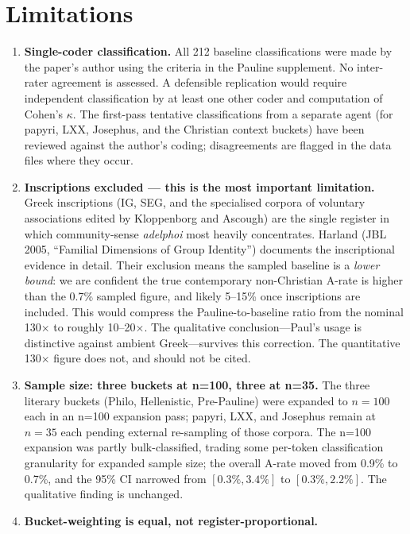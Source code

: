 \documentclass[11pt,oneside]{article}
\begin{document}
\section*{Limitations}

\begin{enumerate}[leftmargin=1.5em]
\item \textbf{Single-coder classification.}  All 212 baseline
  classifications were made by the paper's author using the criteria in
  the Pauline supplement.  No inter-rater agreement is assessed.
  A defensible replication would require independent classification by
  at least one other coder and computation of Cohen's $\kappa$.  The
  first-pass tentative classifications from a separate agent (for
  papyri, LXX, Josephus, and the Christian context buckets) have been
  reviewed against the author's coding; disagreements are flagged in
  the data files where they occur.
\item \textbf{Inscriptions excluded --- this is the most important
  limitation.}  Greek inscriptions (IG, SEG, and the specialised corpora
  of voluntary associations edited by Kloppenborg and Ascough) are the
  single register in which community-sense \textit{adelphoi} most
  heavily concentrates.  Harland (JBL 2005, \enquote{Familial Dimensions
  of Group Identity}) documents the inscriptional
  evidence in detail.  Their exclusion means the sampled baseline is a
  \textit{lower bound}: we are confident the true contemporary
  non-Christian A-rate is higher than the 0.7\% sampled figure, and
  likely 5--15\% once inscriptions are included.  This would compress
  the Pauline-to-baseline ratio from the nominal 130$\times$ to roughly
  10--20$\times$.  The qualitative conclusion---Paul's usage is
  distinctive against ambient Greek---survives this correction.  The
  quantitative 130$\times$ figure does not, and should not be cited.
\item \textbf{Sample size: three buckets at n=100, three at n=35.}
  The three literary buckets (Philo, Hellenistic, Pre-Pauline) were
  expanded to $n = 100$ each in an n=100 expansion pass; papyri,
  LXX, and Josephus remain at $n = 35$ each pending external
  re-sampling of those corpora.  The n=100 expansion was partly
  bulk-classified, trading some per-token classification granularity
  for expanded sample size; the overall A-rate moved from 0.9\%
  to 0.7\%, and the 95\% CI narrowed from $[0.3\%, 3.4\%]$ to
  $[0.3\%, 2.2\%]$.  The qualitative finding is unchanged.
\item \textbf{Bucket-weighting is equal, not register-proportional.}

\end{enumerate}
\end{document}
